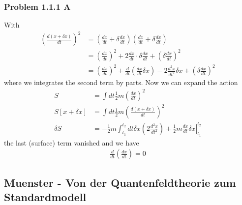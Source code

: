\documentclass[10pt,a4paper]{book}
\theoremstyle{definition}
\begin{document}
\subsubsection{Problem 1.1.1 A}
With
\begin{align}
\left(\frac{d(x+\delta x)}{dt}\right)^2
&=\left(\frac{dx}{dt}+\delta\frac{dx}{dt}\right)\left(\frac{dx}{dt}+\delta\frac{dx}{dt}\right)\\
&=\left(\frac{dx}{dt}\right)^2+2\frac{dx}{dt}\cdot\delta\frac{dx}{dt}+\left(\delta\frac{dx}{dt}\right)^2\\
&=\left(\frac{dx}{dt}\right)^2+\frac{d}{dt}\left(\frac{dx}{dt}\delta x\right)-2\frac{d^2x}{dt^2}\delta x+\left(\delta\frac{dx}{dt}\right)^2
\end{align}
where we integrates the second term by parts. Now we can expand the action
\begin{align}
S
&=\int dt\frac{1}{2}m\left(\frac{dx}{dt}\right)^2\\
S[x+\delta x]
&=\int dt\frac{1}{2}m\left(\frac{d(x+\delta x)}{dt}\right)^2\\
\delta S&=-\frac{1}{2}m\int_{t_1}^{t_2} dt\delta x\left(2\frac{d^2x}{dt^2}\right)+\left.\frac{1}{2}m\frac{dx}{dt}\delta x\right|_{t_1}^{t_2}
\end{align}
the last (surface) term vanished and we have
\begin{align}
\frac{d}{dt}\left(\frac{dx}{dt}\right)=0
\end{align}

\subsection{{\sc Muenster} - Von der Quantenfeldtheorie zum Standardmodell} 
\end{document}

